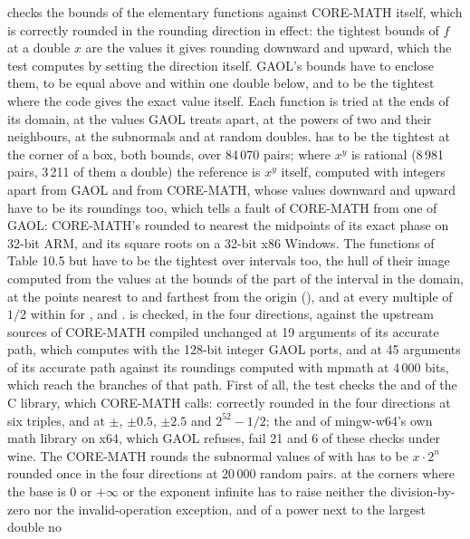 \documentclass[12pt,a4paper,twoside,openright]{book}
\begin{document}
 checks the bounds of the elementary functions against
CORE-MATH itself, which is correctly rounded in the rounding direction in
effect: the tightest bounds of $f$ at a double $x$ are the values it gives
rounding downward and upward, which the test computes by setting the
direction itself. GAOL's bounds have to enclose them, to be equal above and
within one double below, and to be the tightest where the code gives the
exact value itself. Each function is tried at the ends of its domain, at the
values GAOL treats apart, at the powers of two and their neighbours, at the
subnormals and at random doubles.  has to be the tightest
at the corner of a box, both bounds, over 84\,070 pairs; where $x^y$ is
rational (8\,981 pairs, 3\,211 of them a double) the reference is $x^y$
itself, computed with integers apart from GAOL and from CORE-MATH, whose
values downward and upward have to be its roundings too, which tells a
fault of CORE-MATH from one of GAOL: CORE-MATH's  rounded to
nearest the midpoints of its exact phase on 32-bit ARM, and its square roots
on a 32-bit x86 Windows. The functions of Table 10.5 but 
have to be the tightest over intervals too, the hull of their image computed
from the values at the bounds of the part of the interval in the domain, at
the points nearest to and farthest from the origin (), and at
every multiple of $1/2$ within for ,  and
.\newinvfive{}  is checked, in the four directions,
against the upstream sources of CORE-MATH compiled unchanged at 19 arguments
of its accurate path, which computes with the 128-bit integer GAOL ports,
and  at 45 arguments of its accurate path against its roundings
computed with mpmath at 4\,000 bits, which reach the branches of that path.
First of all, the test checks the  and  of the C
library, which CORE-MATH calls:  correctly rounded in the four
directions at six triples, and  at
$\pm$, $\pm0.5$, $\pm2.5$ and $2^{52}-1/2$;
the  and  of
mingw-w64's own math library on x64, which GAOL refuses, fail 21 and 6 of
these checks under wine.\newinvfive{} The  CORE-MATH
rounds the subnormal values of  with has to be $x\cdot2^n$
rounded once in the four directions at 20\,000 random pairs.  at
the corners where the base is 0 or $+\infty$ or the exponent infinite has to
raise neither the division-by-zero nor the invalid-operation exception, and  of a power next to the largest double no
\end{document}
